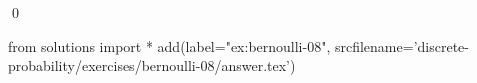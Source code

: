 
\begin{ex} 
  \label{ex:bernoulli-08}
  
  \qed
\end{ex} 
\begin{python0}
from solutions import *
add(label="ex:bernoulli-08",
    srcfilename='discrete-probability/exercises/bernoulli-08/answer.tex') 
\end{python0}
